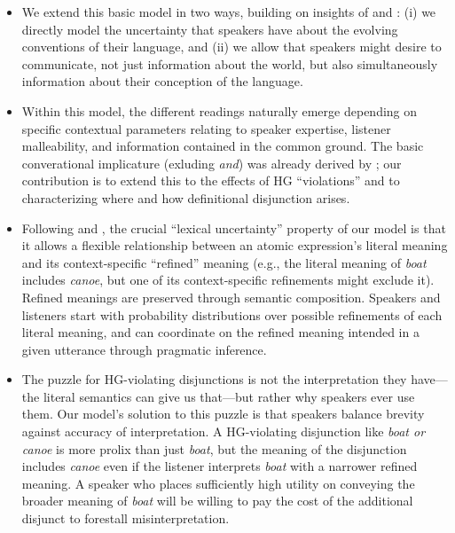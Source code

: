 \documentclass[12pt]{article}
\newcommand{\word}[1]{\emph{#1}}
\begin{document}
\begin{itemize}
\item
We extend this basic model in two ways, building on insights of
\citet{Bergen:Goodman:Levy:2012} and \citet{Smith:Goodman:Frank:2013}:
(i) we directly model the uncertainty that speakers have about the
evolving conventions of their language, and (ii) we allow that
speakers might desire to communicate, not just information about the
world, but also simultaneously information about their conception of
the language. 

\item
Within this model, the different readings naturally emerge depending
on specific contextual parameters relating to speaker expertise,
listener malleability, and information contained in the common ground.
The basic converational implicature (exluding \word{and}) was already
derived by \citealt{Bergen:Goodman:Levy:2012}; our contribution is to
extend this to the effects of HG ``violations'' and to characterizing
where and how definitional disjunction arises.

\item Following \citet{Bergen:Goodman:Levy:2012} and
  \citet{Smith:Goodman:Frank:2013}, the crucial ``lexical
  uncertainty'' property of our model is that it allows a flexible
  relationship between an atomic expression's literal meaning and its
  context-specific ``refined'' meaning (e.g., the literal meaning of
  \emph{boat} includes \emph{canoe}, but one of its context-specific
  refinements might exclude it).  Refined meanings are preserved
  through semantic composition.  Speakers and listeners start with
  probability distributions over possible refinements of each literal
  meaning, and can coordinate on the refined meaning intended in a
  given utterance through pragmatic inference.

\item The puzzle for HG-violating disjunctions is not the
  interpretation they have---the literal semantics can give us
  that---but rather why speakers ever use them. Our model's solution
  to this puzzle is that speakers balance brevity against accuracy of
  interpretation.  A HG-violating disjunction like \emph{boat or
    canoe} is more prolix than just \emph{boat}, but the meaning of
  the disjunction includes \emph{canoe} even if the listener
  interprets \emph{boat} with a narrower refined meaning.  A speaker
  who places sufficiently high utility on conveying the broader meaning of
  \emph{boat} will be willing to pay the cost of the additional
  disjunct to forestall misinterpretation.


\end{itemize}
\end{document}
